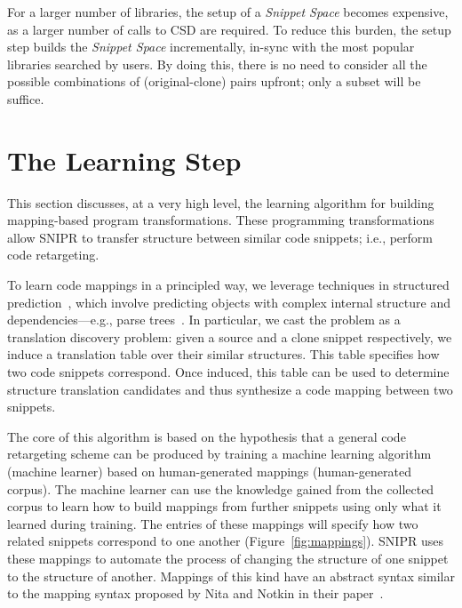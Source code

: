 For a larger number of libraries, the setup of a \emph{Snippet Space} becomes expensive, as a larger number of calls to CSD are required. To reduce this burden, the setup step builds the \emph{Snippet Space} incrementally, in-sync with the most popular libraries searched by users. By doing this, there is no need to consider all the possible combinations of (original-clone) pairs upfront; only a subset will be suffice.

\section{The Learning Step}
\label{sec:learning}

This section discusses, at a very high level, the learning algorithm for building mapping-based program transformations. These programming transformations allow \uppercase{SnipR} to transfer structure between similar code snippets; i.e., perform code retargeting. 

To learn code mappings in a principled way, we leverage techniques in structured prediction~\cite{Collins:2002uo}, which involve predicting objects with complex internal structure and dependencies---e.g., parse trees~\cite{Kumar:2011uj}. In particular, we cast the problem as a translation discovery problem: given a source and a clone snippet respectively, we induce a translation table over their similar structures. This table specifies how two code snippets correspond. Once induced, this table can be used to determine structure translation candidates and thus synthesize a code mapping between two snippets. 

The core of this algorithm is based on the hypothesis that a general code retargeting scheme can be produced by training a machine learning algorithm (machine learner) based on human-generated mappings (human-generated corpus). The machine learner can use the knowledge gained from the collected corpus to learn how to build mappings from further snippets using only what it learned during training. The entries of these mappings will specify how two related snippets correspond to one another (Figure~\ref{fig:mappings}). SNIPR uses these mappings to automate the process of changing the structure of one snippet to the structure of another. Mappings of this kind have an abstract syntax similar to the mapping syntax proposed by Nita and Notkin in their paper~\cite{Nita:2010en}.

